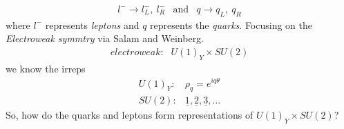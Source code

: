 \begin{equation}
\begin{matrix}
    l^-\rightarrow l^-_{L},\ l^-_{R} & \text{and} & q\rightarrow q_{L},\ q_{R}
\end{matrix}
\end{equation}
where $l^-$ represents \textit{leptons} and $q$ represents the \textit{quarks}. Focusing on the \textit{Electroweak symmtry} via Salam and Weinberg. 
\begin{equation}
    \begin{matrix}
        \textit{electroweak}: & U(1)_{Y}\times SU(2)
    \end{matrix}
\end{equation}
we know the irreps 
\begin{equation}
    \begin{matrix}
        U(1)_{Y}: & \rho_{q} = e^{iq\theta}\\
        SU(2): & \underline{1}, \underline{2}, \underline{3}, \dots
    \end{matrix}
\end{equation}
So, how do the quarks and leptons form representations of $U(1)_{Y}\times SU(2)$?

